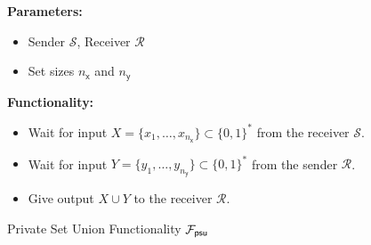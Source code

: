 \begin{figure}[!hbtp]
\begin{framed}
\begin{minipage}[center]{\textwidth}
\begin{trivlist}
\item \textbf{Parameters:} 
\begin{itemize}
\item Sender $\mathcal{S}$, Receiver $\mathcal{R}$
\item Set sizes $n_\mathsf{x}$ and $n_\mathsf{y}$
\end{itemize}

\item \textbf{Functionality:}
\begin{itemize}
\item Wait for input $X=\{x_1,\dots,x_{n_\mathsf{x}}\}\subset \{0,1\}^*$ from the receiver $\mathcal{S}$.
\item Wait for input $Y=\{y_1,\dots,y_{n_\mathsf{y}}\}\subset \{0,1\}^*$ from the sender $\mathcal{R}$.
\item Give output $X \cup Y$ to the receiver $\mathcal{R}$.
\end{itemize}
\end{trivlist}
\end{minipage}
\end{framed}
\caption{Private Set Union Functionality $\mathcal{F}_\mathsf{psu}$}\label{fig:fpsu}
\end{figure}

















